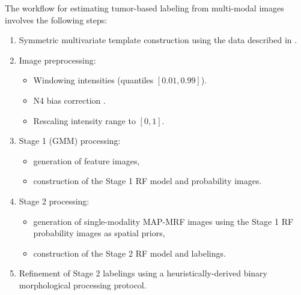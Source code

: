 \documentclass[final,5p,times,twocolumn]{elsarticle}
\begin{document}
The workflow for estimating tumor-based labeling from multi-modal 
images involves the following steps:
\begin{enumerate}
  \item Symmetric multivariate template construction \cite{avants2010}
 using the data described in \cite{landman2011}.
  \item Image preprocessing:
    \begin{itemize}
      \item Windowing intensities (quantiles $[0.01,0.99]$).
      \item N4 bias correction \cite{tustison2010}.
      \item Rescaling intensity range to $[0,1]$.  
    \end{itemize}
  \item Stage 1 (GMM) processing:
  \begin{itemize}
    \item generation of feature images,
    \item construction of the Stage 1 RF model and probability images.
  \end{itemize}
  \item Stage 2 processing:
  \begin{itemize}
    \item generation of single-modality MAP-MRF images using the Stage 1 RF probability images as spatial priors,
    \item construction of the Stage 2 RF model and labelings.
  \end{itemize}
  \item Refinement of Stage 2 labelings using a heuristically-derived binary morphological processing protocol.
\end{enumerate}
\end{document}
